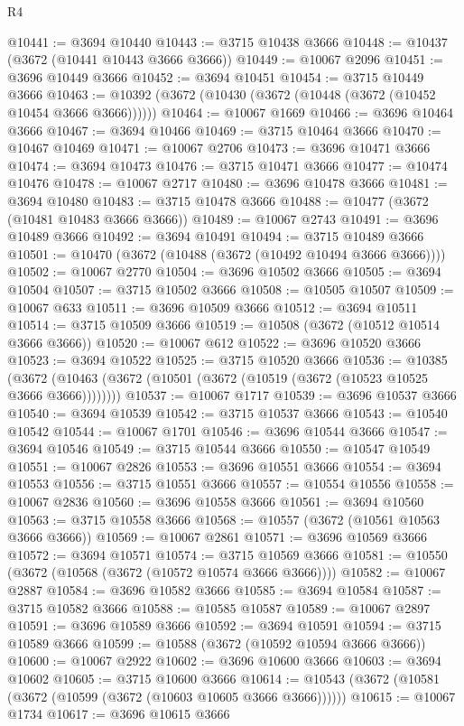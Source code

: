 \begin{lexlean}{R4}
\begin{coremodule}
@10441 := @3694 @10440
@10443 := @3715 @10438 @3666
@10448 := @10437 (@3672 (@10441 @10443 @3666 @3666))
@10449 := @10067 @2096
@10451 := @3696 @10449 @3666
@10452 := @3694 @10451
@10454 := @3715 @10449 @3666
@10463 := @10392 (@3672 (@10430 (@3672 (@10448 (@3672 (@10452 @10454 @3666 @3666))))))
@10464 := @10067 @1669
@10466 := @3696 @10464 @3666
@10467 := @3694 @10466
@10469 := @3715 @10464 @3666
@10470 := @10467 @10469
@10471 := @10067 @2706
@10473 := @3696 @10471 @3666
@10474 := @3694 @10473
@10476 := @3715 @10471 @3666
@10477 := @10474 @10476
@10478 := @10067 @2717
@10480 := @3696 @10478 @3666
@10481 := @3694 @10480
@10483 := @3715 @10478 @3666
@10488 := @10477 (@3672 (@10481 @10483 @3666 @3666))
@10489 := @10067 @2743
@10491 := @3696 @10489 @3666
@10492 := @3694 @10491
@10494 := @3715 @10489 @3666
@10501 := @10470 (@3672 (@10488 (@3672 (@10492 @10494 @3666 @3666))))
@10502 := @10067 @2770
@10504 := @3696 @10502 @3666
@10505 := @3694 @10504
@10507 := @3715 @10502 @3666
@10508 := @10505 @10507
@10509 := @10067 @633
@10511 := @3696 @10509 @3666
@10512 := @3694 @10511
@10514 := @3715 @10509 @3666
@10519 := @10508 (@3672 (@10512 @10514 @3666 @3666))
@10520 := @10067 @612
@10522 := @3696 @10520 @3666
@10523 := @3694 @10522
@10525 := @3715 @10520 @3666
@10536 := @10385
    (@3672 (@10463 (@3672 (@10501 (@3672 (@10519 (@3672 (@10523 @10525 @3666 @3666))))))))
@10537 := @10067 @1717
@10539 := @3696 @10537 @3666
@10540 := @3694 @10539
@10542 := @3715 @10537 @3666
@10543 := @10540 @10542
@10544 := @10067 @1701
@10546 := @3696 @10544 @3666
@10547 := @3694 @10546
@10549 := @3715 @10544 @3666
@10550 := @10547 @10549
@10551 := @10067 @2826
@10553 := @3696 @10551 @3666
@10554 := @3694 @10553
@10556 := @3715 @10551 @3666
@10557 := @10554 @10556
@10558 := @10067 @2836
@10560 := @3696 @10558 @3666
@10561 := @3694 @10560
@10563 := @3715 @10558 @3666
@10568 := @10557 (@3672 (@10561 @10563 @3666 @3666))
@10569 := @10067 @2861
@10571 := @3696 @10569 @3666
@10572 := @3694 @10571
@10574 := @3715 @10569 @3666
@10581 := @10550 (@3672 (@10568 (@3672 (@10572 @10574 @3666 @3666))))
@10582 := @10067 @2887
@10584 := @3696 @10582 @3666
@10585 := @3694 @10584
@10587 := @3715 @10582 @3666
@10588 := @10585 @10587
@10589 := @10067 @2897
@10591 := @3696 @10589 @3666
@10592 := @3694 @10591
@10594 := @3715 @10589 @3666
@10599 := @10588 (@3672 (@10592 @10594 @3666 @3666))
@10600 := @10067 @2922
@10602 := @3696 @10600 @3666
@10603 := @3694 @10602
@10605 := @3715 @10600 @3666
@10614 := @10543 (@3672 (@10581 (@3672 (@10599 (@3672 (@10603 @10605 @3666 @3666))))))
@10615 := @10067 @1734
@10617 := @3696 @10615 @3666

\end{coremodule}
\end{lexlean}
